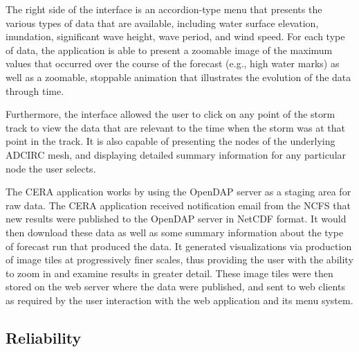 \documentclass[12pt]{article}
\begin{document}
The right side of the interface is an accordion-type menu that 
presents the various types of data that are available, including 
water surface elevation, inundation, significant wave height, wave 
period, and wind speed. For each type of data, the application is 
able to present a zoomable image of the maximum values that occurred 
over the course of the forecast (e.g., high water marks) as well as 
a zoomable, stoppable animation that illustrates the evolution of 
the data through time. 

Furthermore, the interface allowed the user to click on any point of 
the storm track to view the data that are relevant to the time when 
the storm was at that point in the track. It is also capable of 
presenting the nodes of the underlying ADCIRC mesh, and displaying 
detailed summary information for any particular node the user 
selects. 

The CERA application works by using the OpenDAP server as a staging 
area for raw data. The CERA application received notification email 
from the NCFS that new results were published to the OpenDAP server 
in NetCDF format. It would then download these data as well as some 
summary information about the type of forecast run that produced the 
data. It generated visualizations via production of image tiles at 
progressively finer scales, thus providing the user with the ability 
to zoom in and examine results in greater detail. These image tiles 
were then stored on the web server where the data were published, 
and sent to web clients as required by the user interaction with the 
web application and its menu system.

\subsection{Reliability}
\end{document}
